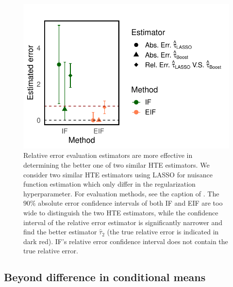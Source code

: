 \documentclass[twoside]{article}
\newcommand{\1}{{\mathbbm{1}}}
\begin{document}
\begin{figure}[ht]
         \centering
        \vspace{-0.5cm}
        \begin{minipage}{0.45\textwidth}
                \centering
                \includegraphics[clip, trim = 0cm 0cm 0cm 0cm, width = \textwidth]{plot/similar_HTE_estimator_LASSO.pdf}
        \end{minipage}
        \vspace{-0.5cm}
        \caption{
        \small
        Relative error evaluation estimators are more effective in determining the better one of two similar HTE estimators.
        We consider two similar HTE estimators using LASSO for nuisance function estimation which only differ in the regularization hyperparameter. 
        For evaluation methods, see the caption of .
        The $90\%$ absolute error confidence intervals of both IF and EIF are too wide to distinguish the two HTE estimators, while the confidence interval of the relative error estimator is significantly narrower and find the better estimator $\hat{\tau}_2$ (the true relative error is indicated in dark red).
        IF's relative error confidence interval does not contain the true relative error.
        }
    \label{fig:similar HTE estimator}
\end{figure}


\subsection{Beyond difference in conditional means}\label{rmk:DINA}
\end{document}

